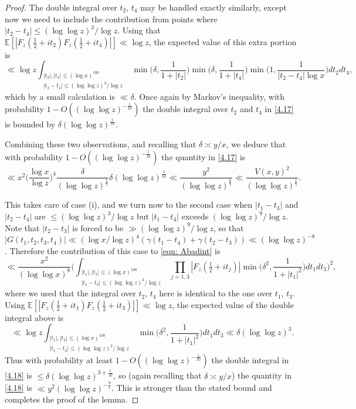 \documentclass[12pt, notitlepage]{amsart}
\numberwithin{equation}{section}
\def\E{\mathbb E}
\theoremstyle{remark}
\theoremstyle{definition}
\theoremstyle{remark}
\numberwithin{equation}{section}
\begin{document}
\begin{proof}
The double integral over $t_2$, $t_4$ may be handled exactly similarly, except now we need to include the contribution from points where $|t_2-t_4| \leq (\log \log z)^{3}/\log z$.
Using that  $\E[ |F_z(\frac 12+it_2) F_z(\tfrac 12+it_4)|] \ll \log z$, the expected value of this extra portion is 
$$ 
\ll \log z \int_{\substack{ |t_2|, |t_4| \le (\log x)^{100} \\ |t_2-t_4| \le (\log \log z)^3/\log z}} \min\Big(\delta, \frac{1}{1+|t_2|}\Big) \min\Big(\delta, \frac{1}{1+|t_4|}\Big) \min\Big(1, \frac{1}{|t_2-t_4|\log x}\Big) dt_2 dt_4,  
$$ 
 which by a small calculation is $\ll \delta$.  Once again by Markov's inequality, with probability $1-O((\log \log z)^{-\frac{1}{10}})$ the double integral over $t_2$ and $t_4$ in \eqref{4.17} is bounded by $\delta (\log \log z)^{\frac 1{10}}$.  
 
 Combining these two observations, and recalling that $\delta \asymp y/x$, we deduce that with probability $1-O((\log \log z)^{-\frac 1{10}})$ the quantity in \eqref{4.17} is 
 $$ 
 \ll x^2 \Big(\frac{\log x}{\log z}\Big)^{4} \frac{\delta}{(\log \log z)^{\frac 75}} \delta (\log \log z)^{\frac 1{10}} \ll \frac{y^2}{(\log \log z)^{\frac 65}} \ll \frac{V(x,y)^2}{(\log \log z)^{\frac 15}}. 
 $$ 

 This takes care of case (i), and we turn now to the second case when $|t_1-t_3|$ and $|t_2-t_4|$ are $\le (\log \log z)^3/\log z$ but $|t_1-t_4|$ exceeds $(\log \log z)^9/\log z$.  Note that $|t_2-t_3|$ is forced to be $\gg (\log \log z)^{9}/\log z$, so that $|G(t_1,t_2,t_3,t_4)| \ll (\log x/\log z)^4 (\gamma(t_1-t_4) + \gamma(t_2-t_3)) \ll (\log \log z)^{-8}$.  
Therefore the contribution of this case to \eqref{eqn: Abadint} is 
\begin{equation} 
\label{4.18} 
\ll \frac{x^2}{(\log \log x)^8} \Big( \int_{\substack{|t_1|, |t_3| \le (\log x)^{100} \\ |t_1-t_3| \le (\log \log z)^3/\log z} } \prod_{j=1,3} |F_z(\tfrac 12+it_j)| \min\Big(\delta^2, \frac{1}{1+|t_1|^2}\Big) dt_1 dt_3 \Big)^2,
\end{equation}
where we used that the integral over $t_2$, $t_4$ here is identical to the one over $t_1$, $t_3$.    Using  $\E[ |F_z(\frac 12+it_1) F_z(\tfrac 12+it_3)|] \ll \log z$, the expected value of the double integral above is 
$$ 
\ll \log z  \int_{\substack{|t_1|, |t_3| \le (\log x)^{100} \\ |t_1-t_3| \le (\log \log z)^3/\log z} } \min\Big(\delta^2, \frac{1}{1+|t_1|^2}\Big) dt_1 dt_3 \ll \delta (\log \log z)^3.
$$ 
Thus with probability at least $1-O((\log \log z)^{-\frac 1{10}})$ the double integral in \eqref{4.18} is $\le \delta (\log \log z)^{3+\frac {1}{10}}$, so (again recalling that $\delta \asymp y/x$) the quantity in \eqref{4.18} 
is $\ll y^2 (\log \log z)^{-\frac{9}{5}}$.   This is stronger than the stated bound and completes the proof of the lemma. 
 \end{proof}
\end{document}
